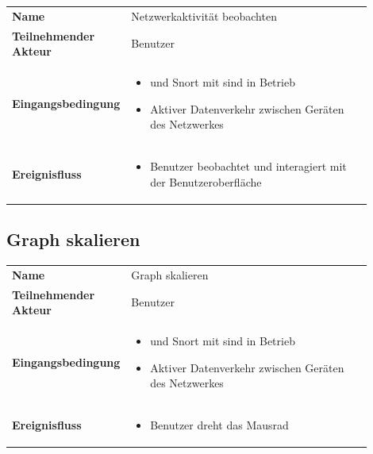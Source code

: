 \begin{tabular}{lp{0.9\linewidth}}
\textbf{Name} & Netzwerkaktivität beobachten \\

\textbf{Teilnehmender Akteur} & Benutzer \\

\textbf{Eingangsbedingung} &
				\begin{minipage}[t]{\linewidth}
				\begin{itemize}[nosep,after=\strut,leftmargin=10pt]
				
				\item \programname und Snort mit \sppname sind in Betrieb
				\item Aktiver Datenverkehr zwischen Geräten des Netzwerkes

				\end{itemize}
				\end{minipage} \\
\textbf{Ereignisfluss} &
				\begin{minipage}[t]{\linewidth}
				\begin{itemize}[nosep,after=\strut,leftmargin=10pt]

				\item Benutzer beobachtet und interagiert mit der Benutzeroberfläche
				\end{itemize}
				\end{minipage} \\

\end{tabular}

\subsection{Graph skalieren}

\begin{tabular}{lp{0.9\linewidth}}
\textbf{Name} & Graph skalieren \\

\textbf{Teilnehmender Akteur} & Benutzer \\

\textbf{Eingangsbedingung} &
				\begin{minipage}[t]{\linewidth}
				\begin{itemize}[nosep,after=\strut,leftmargin=10pt]
				
				\item \programname und Snort mit \sppname sind in Betrieb
				\item Aktiver Datenverkehr zwischen Geräten des Netzwerkes

				\end{itemize}
				\end{minipage} \\
\textbf{Ereignisfluss} &
				\begin{minipage}[t]{\linewidth}
				\begin{itemize}[nosep,after=\strut,leftmargin=10pt]
				\item Benutzer dreht das Mausrad
				\end{itemize}
				\end{minipage} \\
\end{tabular}


